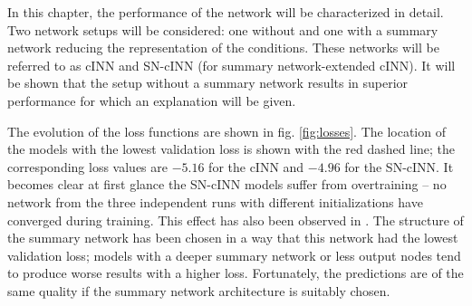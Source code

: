 
In this chapter, the performance of the network will be characterized in detail. Two network setups will be considered: one without and one with a summary network reducing the representation of the conditions. These networks will be referred to as cINN and SN-cINN (for summary network-extended cINN). It will be shown that the setup without a summary network results in superior performance for which an explanation will be given. 


The evolution of the loss functions are shown in fig. \ref{fig:losses}. The location of the models with the lowest validation loss is shown with the red dashed line; the corresponding loss values are $-5.16$ for the cINN and $-4.96$ for the SN-cINN. It becomes clear at first glance the SN-cINN models suffer from overtraining -- no network from the three independent runs with different initializations have converged during training. This effect has also been observed in \cite{Ksoll_2020}. The structure of the summary network has been chosen in a way that this network had the lowest validation loss; models with a deeper summary network or less output nodes tend to produce worse results with a higher loss. Fortunately, the predictions are of the same quality if the summary network architecture is suitably chosen.

